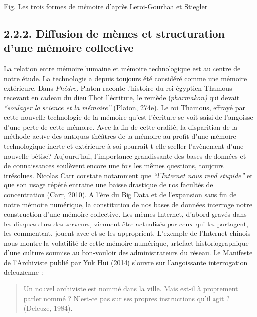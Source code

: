 Fig. Les trois formes de m\'emoire d{\textquoteright}apr\`es
Leroi-Gourhan et Stiegler

\subsection[Diffusion de m\`emes et structuration d{\textquoteright}une m\'emoire collective]{2.2.2. Diffusion de m\`emes et structuration d{\textquoteright}une m\'emoire collective}
La relation entre m\'emoire humaine et m\'emoire technologique est au centre de notre \'etude. La technologie a depuis toujours \'et\'e consid\'er\'e comme une m\'emoire ext\'erieure. Dans \textit{Ph\`edre, }Platon raconte l{\textquoteright}histoire du roi \'egyptien Thamous recevant en cadeau du dieu Thot l{\textquoteright}\'ecriture, le rem\`ede (\textit{pharmakon) }qui devait \textit{{\textquotedblleft}soulager la science et la m\'emoire{\textquotedblright} }(Platon, 274e). Le roi Thamous, effray\'e par cette nouvelle technologie de la m\'emoire qu{\textquoteright}est l{\textquoteright}\'ecriture se voit saisi de l{\textquoteright}angoisse d{\textquoteright}une perte de cette m\'emoire. Avec la fin de cette oralit\'e, la disparition de la m\'ethode active des antiques th\'e\^atres de la m\'emoire au profit d{\textquoteright}une m\'emoire technologique inerte et ext\'erieure \`a soi pourrait-t-elle sceller l{\textquoteright}av\`enement d{\textquoteright}une nouvelle b\^etise? Aujourd{\textquoteright}hui, l{\textquoteright}importance grandissante des bases de donn\'ees et de connaissances soul\`event encore une fois les m\^emes questions, toujours irr\'esolues. Nicolas Carr constate notamment que \textit{{\textquotedblleft}l{\textquoteright}Internet nous rend stupide{\textquotedblright}} et que son usage r\'ep\'et\'e entraine une baisse drastique de nos facult\'es de concentration (Carr, 2010). A l{\textquoteright}\`ere du Big Data et de l{\textquoteright}expansion sans fin de notre m\'emoire num\'erique, la constitution de nos bases de donn\'ees interroge notre construction d{\textquoteright}une m\'emoire collective. Les m\`emes Internet, d{\textquoteright}abord grav\'es dans les disques durs des serveurs, viennent \^etre actualis\'es par ceux qui les partagent, les commentent, jouent avec et se les approprient. L{\textquoteright}exemple de l{\textquoteright}Internet chinois nous montre la volatilit\'e de cette m\'emoire num\'erique, artefact historiographique d{\textquoteright}une culture soumise au bon-vouloir des administrateurs du r\'eseau. Le Manifeste de l{\textquoteright}Archiviste publi\'e par Yuk Hui (2014) s{\textquoteright}ouvre sur l{\textquoteright}angoissante interrogation deleuzienne :  \begin{quote}
Un nouvel archiviste est nomm\'e dans la ville. Mais est-il \`a proprement parler nomm\'e ?
N'est-ce pas sur ses propres instructions qu'il agit ? 
(Deleuze, 1984).
\end{quote}

